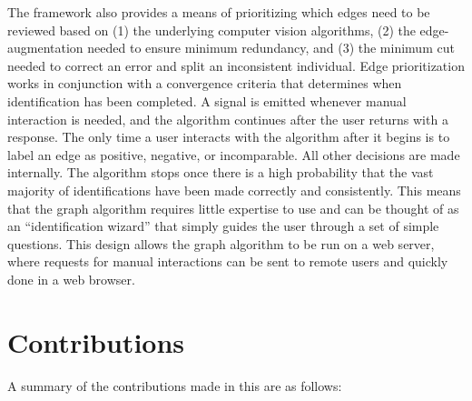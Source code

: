     The framework also provides a means of prioritizing which edges need to be reviewed based on
    (1) the underlying computer vision algorithms,
    (2) the edge-augmentation needed to ensure minimum redundancy, and
    (3) the minimum cut needed to correct an error and split an inconsistent individual.
    Edge prioritization works in conjunction with a convergence criteria that determines when identification has
      been completed.
    A signal is emitted whenever manual interaction is needed, and the algorithm continues after the user returns
      with a response.
    The only time a user interacts with the algorithm after it begins is to label an edge as positive, negative,
      or incomparable.
    All other decisions are made internally.
    The algorithm stops once there is a high probability that the vast majority of identifications have been made
      correctly and consistently.
    This means that the graph algorithm requires little expertise to use and can be thought of as an
      ``identification wizard'' that simply guides the user through a set of simple questions.
    This design allows the graph algorithm to be run on a web server, where requests for manual interactions can
      be sent to remote users and quickly done in a web browser.

    \section{Contributions}\label{sec:contributions}

    A summary of the contributions made in this \thesis{} are as follows:

